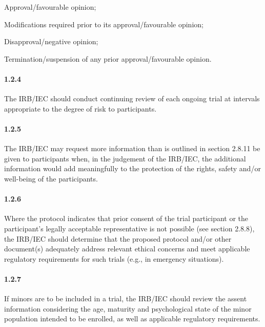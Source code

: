 \documentclass[11pt]{article}
\begin{document}
\begin{description}[leftmargin=2.5cm,style=sameline]

\item[(a)] Approval/favourable opinion;

\item[(b)] Modifications required prior to its approval/favourable opinion;

\item[(c)] Disapproval/negative opinion;

\item[(d)] Termination/suspension of any prior approval/favourable opinion.

\end{description}

\paragraph{1.2.4} The IRB/IEC should conduct continuing review of each ongoing trial at intervals appropriate to the degree of risk to participants.

\paragraph{1.2.5} The IRB/IEC may request more information than is outlined in section 2.8.11 be given to participants when, in the judgement of the IRB/IEC, the additional information would add meaningfully to the protection of the rights, safety and/or well-being of the participants.

\paragraph{1.2.6} Where the protocol indicates that prior consent of the trial participant or the participant's legally acceptable representative is not possible (see section 2.8.8), the IRB/IEC should determine that the proposed protocol and/or other document(s) adequately address relevant ethical concerns and meet applicable regulatory requirements for such trials (e.g., in emergency situations).

\paragraph{1.2.7} If minors are to be included in a trial, the IRB/IEC should review the assent information considering the age, maturity and psychological state of the minor population intended to be enrolled, as well as applicable regulatory requirements.
\end{document}
